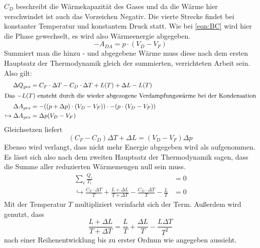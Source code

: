 $C_D$ beschreibt die Wärmekapazität des Gases und da die Wärme hier verschwindet ist auch das Vorzeichen Negativ.
Die vierte Strecke findet bei konstanter Temperatur und konstantem Druck statt. Wie bei \eqref{eqn:BC} wird hier die Phase gewechselt, es wird also Wärmeenergie 
abgegeben.
\begin{equation}
    -A_{DA} = p \cdot (V_D - V_F)
\end{equation}
Summiert man die hinzu - und abgegebene Wärme muss diese nach dem ersten Hauptsatz der Thermodynamik gleich der summierten, verrichteten Arbeit sein.
Also gilt:
\begin{align*}
     \Delta Q_{ges} &= C_F \cdot \Delta T - C_D \cdot \Delta T + L(T) + \Delta L - L(T) \\
     \intertext{Das $-L(T)$ ensteht durch die wieder abgezogene Verdampfungswärme bei der Kondensation}
    \Delta A_{ges} &= -((p+ \Delta p) \cdot (V_D-V_F)) \cdot -(p \cdot (V_D - V_F)) \\
    \hookrightarrow \Delta A_{ges} &= \Delta p (V_D - V_F) 
\end{align*}
Gleichsetzen liefert 
\begin{equation}
    (C_F-C_D)\Delta T + \Delta L = (V_D - V_F) \Delta p
\end{equation}
Ebenso wird verlangt, dass nicht mehr Energie abgegeben wird als aufgenommen. Es lässt sich also nach dem zweiten Hauptsatz der Thermodynamik
sagen, dass die Summe aller reduzierten Wärmemengen null sein muss.
\begin{align*}
    \sum_i \frac{Q_i}{T_i} &= 0 \\
    \hookrightarrow \frac{C_F \cdot\Delta T}{T} + \frac{L + \Delta L}{T+ \Delta T}-\frac{C_D \cdot \Delta T}{T}-\frac{L}{T} &= 0
\end{align*}
Mit der Temperatur $T$ multipliziert verinfacht sich der Term. Außerdem wird genutzt, dass 
\begin{equation*}
    \frac{L+ \Delta L}{T + \Delta T} = \frac{L}{T} + \frac{\Delta L}{T} - \frac{L \Delta T}{T^2}
\end{equation*}
nach einer Reihenentwicklung bis zu erster Ordnun wie angegeben aussieht.